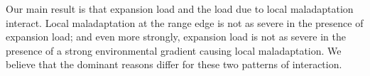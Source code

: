 

Our main result is that expansion load and the load due to local maladaptation interact. Local maladaptation at the range edge is not as severe in the presence of expansion load; and even more strongly, expansion load is not as severe in the presence of a strong environmental gradient causing local maladaptation. We believe that the dominant reasons differ for these two patterns of interaction. 

